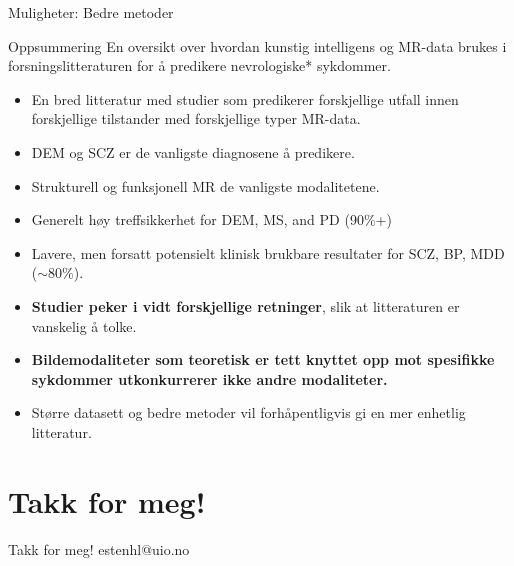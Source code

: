 \documentclass[10pt]{beamer}
\begin{document}
\begin{frame}{Muligheter: Bedre metoder}
    \end{frame}

    \begin{frame}{Oppsummering}
        \small{En oversikt over hvordan kunstig intelligens og MR-data brukes i forsningslitteraturen for å predikere nevrologiske* sykdommer.}
        \begin{itemize}
            \item \footnotesize{En bred litteratur med studier som predikerer forskjellige utfall innen forskjellige tilstander med forskjellige typer MR-data.}
            \item \footnotesize{DEM og SCZ er de vanligste diagnosene å predikere.}
            \item \footnotesize{Strukturell og funksjonell MR de vanligste modalitetene.}
            \item \footnotesize{Generelt høy treffsikkerhet for DEM, MS, and PD (90\%+)}
            \item \footnotesize{Lavere, men forsatt potensielt klinisk brukbare resultater for SCZ, BP, MDD ($\sim$80\%).}
            \item \footnotesize{\textbf{Studier peker i vidt forskjellige retninger}, slik at litteraturen er vanskelig å tolke.}
            \item \footnotesize{\textbf{Bildemodaliteter som teoretisk er tett knyttet opp mot spesifikke sykdommer utkonkurrerer ikke andre modaliteter.}}
            \item \footnotesize{Større datasett og bedre metoder vil forhåpentligvis gi en mer enhetlig litteratur.}
        \end{itemize}
    \end{frame}

    \section{Takk for meg!}

    \begin{frame}{Takk for meg!}
        \centering
        estenhl@uio.no
    \end{frame}
\end{document}
